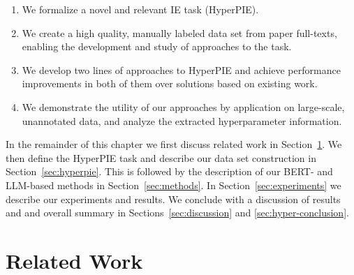\begin{enumerate}
    \item We formalize a novel and relevant IE task (HyperPIE).
    \item We create a high quality, manually labeled data set from paper full-texts, enabling the development and study of approaches to the task.
    \item We develop two lines of approaches to HyperPIE and achieve performance improvements in both of them over solutions based on existing work.
    \item We demonstrate the utility of our approaches by application on large-scale, unannotated data, and analyze the extracted hyperparameter information.
\end{enumerate}

In the remainder of this chapter we first discuss related work in Section~\ref{sec:refwork}. We then define the HyperPIE task and describe our data set construction in Section~\ref{sec:hyperpie}. This is followed by the description of our BERT- and LLM-based methods in Section~\ref{sec:methods}. In Section~\ref{sec:experiments} we describe our experiments and results. We conclude with a discussion of results and and overall summary in Sections~\ref{sec:discussion} and \ref{sec:hyper-conclusion}.


\section{Related Work}\label{sec:refwork}



